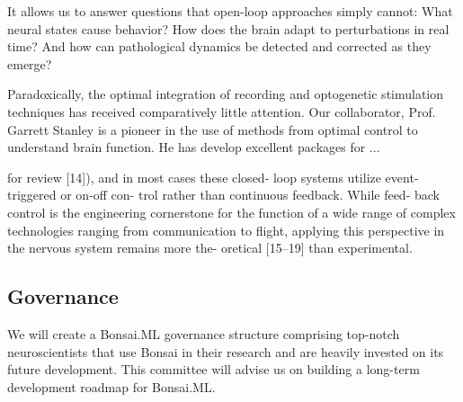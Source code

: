 It allows us to answer questions that open-loop approaches simply
cannot: What neural states cause behavior? How does the brain adapt to
perturbations in real time? And how can pathological dynamics be detected and
corrected as they emerge?

Paradoxically, the optimal integration of recording and optogenetic stimulation
techniques has received comparatively little attention. Our collaborator,
Prof.~ Garrett Stanley is a pioneer in the use of methods from optimal control
to understand brain function. He has develop excellent packages for ...

for review [14]), and in most cases these closed-
loop systems utilize event-triggered or on-off con-
trol rather than continuous feedback. While feed-
back control is the engineering cornerstone for the
function of a wide range of complex technologies
ranging from communication to flight, applying this
perspective in the nervous system remains more the-
oretical [15–19] than experimental.

\subsection*{Governance}

We will create a Bonsai.ML governance structure comprising top-notch
neuroscientists that use Bonsai in their research and are heavily invested on
its future development.
%
This committee will advise us on building a long-term development roadmap for
Bonsai.ML.
